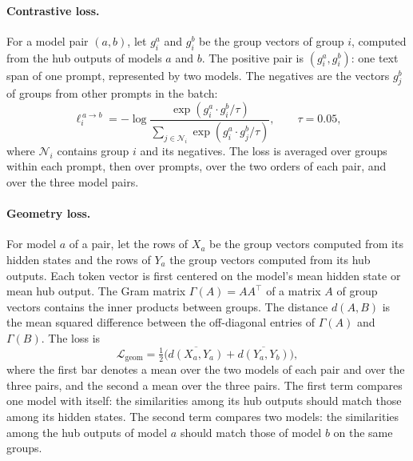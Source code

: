 \paragraph{Contrastive loss.} For a model pair $(a,b)$, let $g^a_i$ and $g^b_i$ be the group vectors of group $i$, computed from the hub outputs of models $a$ and $b$.
The positive pair is $(g^a_i, g^b_i)$: one text span of one prompt, represented by two models.
The negatives are the vectors $g^b_j$ of groups from other prompts in the batch:
\begin{equation}
\ell^{\,a\to b}_i = -\log\frac{\exp(g^a_i\cdot g^b_i/\tau)}{\sum_{j\in\mathcal{N}_i}\exp(g^a_i\cdot g^b_j/\tau)},
\qquad \tau = 0.05 ,
\label{eq:hub:infonce}
\end{equation}
where $\mathcal{N}_i$ contains group $i$ and its negatives.
The loss is averaged over groups within each prompt, then over prompts, over the two orders of each pair, and over the three model pairs. %

\paragraph{Geometry loss.} For model $a$ of a pair, let the rows of $X_a$ be the group vectors computed from its hidden states and the rows of $Y_a$ the group vectors computed from its hub outputs.
Each token vector is first centered on the model's mean hidden state or mean hub output.
The Gram matrix $\Gamma(A) = AA^{\top}$ of a matrix $A$ of group vectors contains the inner products between groups.
The distance $d(A,B)$ is the mean squared difference between the off-diagonal entries of $\Gamma(A)$ and $\Gamma(B)$.
The loss is
\begin{equation}
\mathcal{L}_{\text{geom}} = \tfrac{1}{2}\Big(\overline{d(X_a, Y_a)} + \overline{d(Y_a, Y_b)}\Big),
\label{eq:hub:geom}
\end{equation}
where the first bar denotes a mean over the two models of each pair and over the three pairs, and the second a mean over the three pairs.
The first term compares one model with itself: the similarities among its hub outputs should match those among its hidden states.
The second term compares two models: the similarities among the hub outputs of model $a$ should match those of model $b$ on the same groups. %

